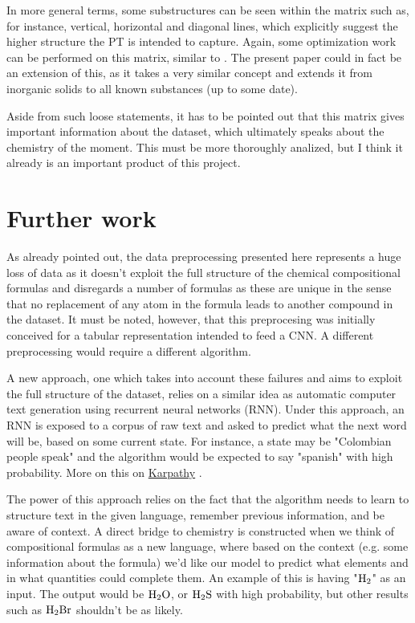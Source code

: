 \documentclass[]{article}
\begin{document}
In more general terms, some substructures can be seen within the matrix such as, for instance, vertical, horizontal and diagonal lines, which explicitly suggest the higher structure the PT is intended to capture. Again, some optimization work can be performed on this matrix, similar to \cite{Glawe_2016}. The present paper could in fact be an extension of this, as it takes a very similar concept and extends it from inorganic solids to all known substances (up to some date).

Aside from such loose statements, it has to be pointed out that this matrix gives important information about the dataset, which ultimately speaks about the chemistry of the moment. This must be more thoroughly analized, but I think it already is an important product of this project.

\section{Further work}

As already pointed out, the data preprocessing presented here represents a huge loss of data as it doesn't exploit the full structure of the chemical compositional formulas and disregards a number of formulas as these are unique in the sense that no replacement of any atom in the formula leads to another compound in the dataset. It must be noted, however, that this preprocesing was initially conceived for a tabular representation intended to feed a CNN. A different preprocessing would require a different algorithm.

A new approach, one which takes into account these failures and aims to exploit the full structure of the dataset, relies on a similar idea as automatic computer text generation using recurrent neural networks (RNN). Under this approach, an RNN is exposed to a corpus of raw text and asked to predict what the next word will be, based on some current state. For instance, a state may be "Colombian people speak" and the algorithm would be expected to say "spanish" with high probability. More on this on \href{https://karpathy.github.io/2015/05/21/rnn-effectiveness/}{Karpathy} \cite{text_gen_rnn}.

The power of this approach relies on the fact that the algorithm needs to learn to structure text in the given language, remember previous information, and be aware of context. A direct bridge to chemistry is constructed when we think of compositional formulas as a new language, where based on the context (e.g. some information about the formula) we'd like our model to predict what elements and in what quantities could complete them. An example of this is having "$\ce{H2}$" as an input. The output would be $\ce{H2O}$, or $\ce{H2S}$ with high probability, but other results such as $\ce{H2Br}$ shouldn't be as likely.
\end{document}
